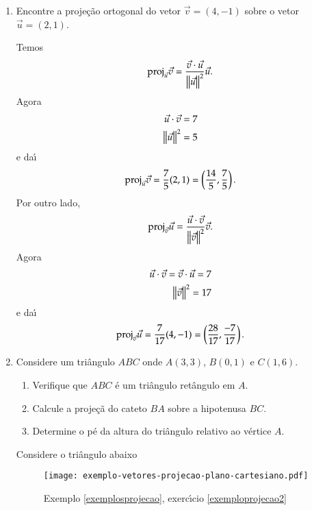 \begin{exemplos}\label{exemplosprojecao}
  \begin{enumerate}
    \item Encontre a proje\c{c}\~ao ortogonal do vetor $\vec{v} = (4, -1)$ sobre o vetor $\vec{u} = (2, 1)$.
    \begin{solucao}
       Temos
       \[
          {\rm proj}_{\vec{u}}\vec{v} = \dfrac{\vec{v}\cdot\vec{u}}{\left\Vert{\vec{u}}\right\Vert^2}\vec{u}.
       \]
       Agora
       \begin{align*}
         \vec{u}\cdot\vec{v} = 7\\
         \left\Vert{\vec{u}}\right\Vert^2 = 5
       \end{align*}
       e da{\'\i}
       \[
          {\rm proj}_{\vec{u}}\vec{v} = \dfrac{7}{5}(2, 1) = \left(\dfrac{14}{5}, \dfrac{7}{5}\right).
       \]
       Por outro lado,
       \[
          {\rm proj}_{\vec{v}}\vec{u} = \dfrac{\vec{u}\cdot\vec{v}}{\left\Vert{\vec{v}}\right\Vert^2}\vec{v}.
       \]
       Agora
       \begin{align*}
         \vec{u}\cdot\vec{v} = \vec{v}\cdot\vec{u} = 7\\
         \left\Vert{\vec{v}}\right\Vert^2 = 17
       \end{align*}
       e da{\'\i}
       \[
          {\rm proj}_{\vec{v}}\vec{u} = \dfrac{7}{17}(4, -1) = \left(\dfrac{28}{17}, \dfrac{-7}{17}\right).
       \]
     \end{solucao} 
     \item Considere um tri\^angulo $ABC$ onde $A(3,3)$, $B(0,1)$ e $C(1,6)$.
     \begin{enumerate}\label{exemploprojecao2}
       \item Verifique que $ABC$ \'e um tri\^angulo ret\^angulo em $A$.
       \item Calcule a proje\c{c}\~a do cateto $BA$ sobre a hipotenusa $BC$.
       \item Determine o p\'e da altura do tri\^angulo relativo ao v\'ertice $A$.
     \end{enumerate}
     \begin{solucao}
       Considere o tri\^angulo abaixo
       \begin{figure}[!h]
        \centering
        \caption{Exemplo \ref{exemplosprojecao}, exerc{\'\i}cio \ref{exemploprojecao2}}
        \texttt{[image: exemplo-vetores-projecao-plano-cartesiano.pdf]}


\end{figure}
\end{solucao}
\end{enumerate}
\end{exemplos}
